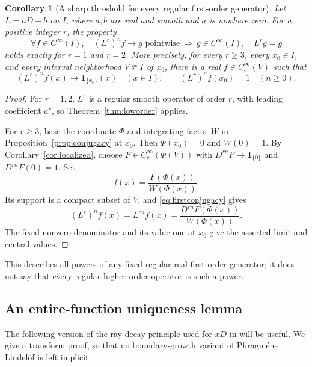 \documentclass[11pt,reqno]{amsart}
\numberwithin{equation}{section}
\newtheorem{corollary}[theorem]{Corollary}
\theoremstyle{definition}
\theoremstyle{remark}
\newcommand{\ind}{\mathbf 1}
\begin{document}
\begin{corollary}[A sharp threshold for every regular first-order generator]\label{cor:firstpowers}
Let $L=aD+b$ on $I$, where $a,b$ are real and smooth and $a$ is nowhere zero. For a positive integer $r$, the property
\[
 \forall f\in C^\infty(I),\quad
 (L^r)^nf\to g\text{ pointwise}
 \ \Longrightarrow\ g\in C^\infty(I),\quad L^rg=g
\]
holds exactly for $r=1$ and $r=2$. More precisely, for every $r\ge3$, every $x_0\in I$, and every interval neighborhood $V\Subset I$ of $x_0$, there is a real $f\in C_c^\infty(V)$ such that
\[
 (L^r)^nf(x)\longrightarrow\ind_{\{x_0\}}(x)\quad(x\in I),
 \qquad (L^r)^nf(x_0)=1\quad(n\ge0).
\]
\end{corollary}
\begin{proof}
For $r=1,2$, $L^r$ is a regular smooth operator of order $r$, with leading coefficient $a^r$, so Theorem~\ref{thm:loworder} applies.

For $r\ge3$, base the coordinate $\Phi$ and integrating factor $W$ in Proposition~\ref{prop:conjugacy} at $x_0$. Then $\Phi(x_0)=0$ and $W(0)=1$. By Corollary~\ref{cor:localized}, choose $F\in C_c^\infty(\Phi(V))$ with $D^{rn}F\to\ind_{\{0\}}$ and $D^{rn}F(0)=1$. Set
\[
 f(x)=\frac{F(\Phi(x))}{W(\Phi(x))}.
\]
Its support is a compact subset of $V$, and \eqref{eq:firstconjugacy} gives
\[
 (L^r)^nf(x)=L^{rn}f(x)
 =\frac{D^{rn}F(\Phi(x))}{W(\Phi(x))}.
\]
The fixed nonzero denominator and its value one at $x_0$ give the asserted limit and central values.
\end{proof}
This describes all powers of any fixed regular real first-order generator; it does not say that every regular higher-order operator is such a power.

\subsection{An entire-function uniqueness lemma}
The following version of the ray-decay principle used for $xD$ in \cite{project} will be useful. We give a transform proof, so that no boundary-growth variant of Phragm\'en--Lindel\"of is left implicit.
\end{document}
